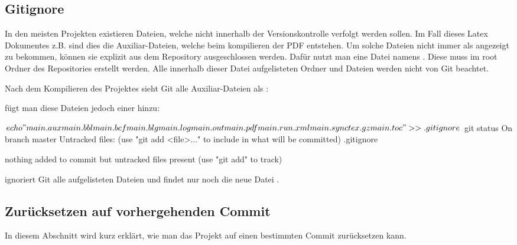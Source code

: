 \subsection{Gitignore}
In den meisten Projekten existieren Dateien, welche nicht innerhalb der Versionskontrolle verfolgt werden sollen. Im Fall dieses Latex Dokumentes z.B. sind dies die Auxiliar-Dateien, welche beim kompilieren der PDF entstehen. Um solche Dateien nicht immer als  angezeigt zu bekommen, können sie explizit aus dem Repository ausgeschlossen werden. Dafür nutzt man eine Datei namens . Diese muss im root Ordner des Repositories erstellt werden. Alle innerhalb dieser Datei aufgelisteten Ordner und Dateien werden nicht von Git beachtet.

Nach dem Kompilieren des Projektes sieht Git alle Auxiliar-Dateien als :
fügt man diese Dateien jedoch einer  hinzu:
\begin{mplisting}
$ echo "main.aux
	main.bbl
	main.bcf
	main.blg
	main.log
	main.out
	main.pdf
	main.run.xml
	main.synctex.gz
	main.toc" >> .gitignore
$ git status
On branch master
Untracked files:
(use "git add <file>..." to include in what will be committed)
.gitignore

nothing added to commit but untracked files present (use "git add" to track)
\end{mplisting}
ignoriert Git alle aufgelisteten Dateien und findet nur noch die neue Datei .

\subsection{Zurücksetzen auf vorhergehenden Commit}
In diesem Abschnitt wird kurz erklärt, wie man das Projekt auf einen bestimmten Commit zurücksetzen kann.

